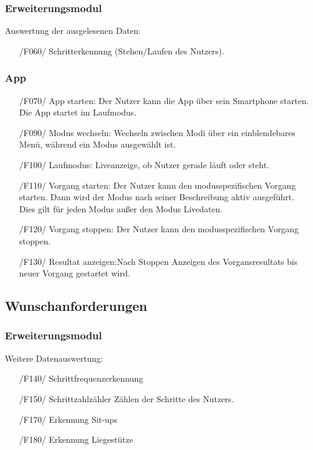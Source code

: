 \documentclass[a4paper,12pt]{article}
\begin{document}
    \subsubsection{Erweiterungsmodul}
     Auswertung der ausgelesenen Daten:
     \begin{itemize}
      \item[/F060/] Schritterkennung (Stehen/Laufen des Nutzers).
    \end{itemize}
    \subsubsection{App}
      \begin{itemize}
      \item[/F070/] \textsf{App starten:} Der Nutzer kann die App über sein Smartphone starten. Die App startet im Laufmodus.
      \item[/F090/] \textsf{Modus wechseln:} Wechseln zwischen Modi über ein einblendebares Menü, während ein Modus ausgewählt ist.
      \item[/F100/] \textsf{Laufmodus:} Liveanzeige, ob Nutzer gerade \glqq läuft\grqq{} oder \glqq steht\grqq{}.
      \item[/F110/] \textsf{Vorgang starten:} Der Nutzer kann den modusspezifischen \Gls{Vorgang} starten. Dann wird der Modus nach seiner Beschreibung aktiv ausgeführt. Dies gilt für jeden Modus außer den Modus \glqq Livedaten\grqq.
      \item[/F120/] \textsf{Vorgang stoppen:} Der Nutzer kann den modusspezifischen \Gls{Vorgang} stoppen.
      \item[/F130/] \textsf{Resultat anzeigen:}Nach Stoppen Anzeigen des Vorgansresultats bis neuer \Gls{Vorgang} gestartet wird.
    \end{itemize}
  \subsection{Wunschanforderungen}
    \subsubsection{Erweiterungsmodul}
      Weitere Datenauswertung:
      \begin{itemize}
      \item[/F140/] \textsf{Schrittfrequenzerkennung}
      \item[/F150/] \textsf{Schrittzahlzähler} Zählen der Schritte des Nutzers.
      \item[/F170/] \textsf{Erkennung Sit-ups}
      \item[/F180/] \textsf{Erkennung Liegestütze}
      \end{itemize} 
\end{document}
